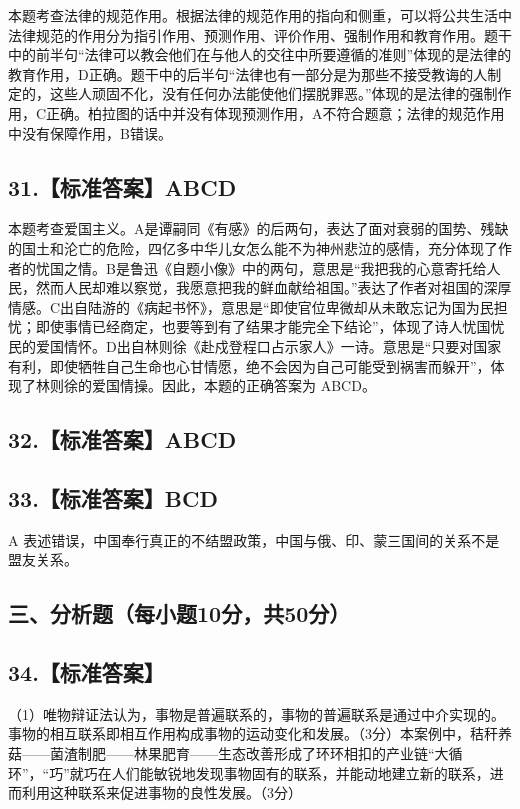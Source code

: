 \documentclass[UTF8,11pt]{ctexart}
\begin{document}
本题考查法律的规范作用。根据法律的规范作用的指向和侧重，可以将公共生活中法律规范的作用分为指引作用、预测作用、评价作用、强制作用和教育作用。题干中的前半句“法律可以教会他们在与他人的交往中所要遵循的准则”体现的是法律的教育作用，D正确。题干中的后半句“法律也有一部分是为那些不接受教诲的人制定的，这些人顽固不化，没有任何办法能使他们摆脱罪恶。”体现的是法律的强制作用，C正确。柏拉图的话中并没有体现预测作用，A不符合题意；法律的规范作用中没有保障作用，B错误。


\subsection*{31.【标准答案】ABCD}

本题考查爱国主义。A是谭嗣同《有感》的后两句，表达了面对衰弱的国势、残缺的国土和沦亡的危险，四亿多中华儿女怎么能不为神州悲泣的感情，充分体现了作者的忧国之情。B是鲁迅《自题小像》中的两句，意思是“我把我的心意寄托给人民，然而人民却难以察觉，我愿意把我的鲜血献给祖国。”表达了作者对祖国的深厚情感。C出自陆游的《病起书怀》，意思是“即使官位卑微却从未敢忘记为国为民担忧；即使事情已经商定，也要等到有了结果才能完全下结论”，体现了诗人忧国忧民的爱国情怀。D出自林则徐《赴戍登程口占示家人》一诗。意思是“只要对国家有利，即使牺牲自己生命也心甘情愿，绝不会因为自己可能受到祸害而躲开”，体现了林则徐的爱国情操。因此，本题的正确答案为 ABCD。


\subsection*{32.【标准答案】ABCD}

\subsection*{33.【标准答案】BCD}

A 表述错误，中国奉行真正的不结盟政策，中国与俄、印、蒙三国间的关系不是盟友关系。


\subsection*{三、分析题（每小题10分，共50分）}

\subsection*{34.【标准答案】}

（1）唯物辩证法认为，事物是普遍联系的，事物的普遍联系是通过中介实现的。事物的相互联系即相互作用构成事物的运动变化和发展。（3分）本案例中，秸秆养菇——菌渣制肥——林果肥育——生态改善形成了环环相扣的产业链“大循环”，“巧”就巧在人们能敏锐地发现事物固有的联系，并能动地建立新的联系，进而利用这种联系来促进事物的良性发展。（3分）
\end{document}
